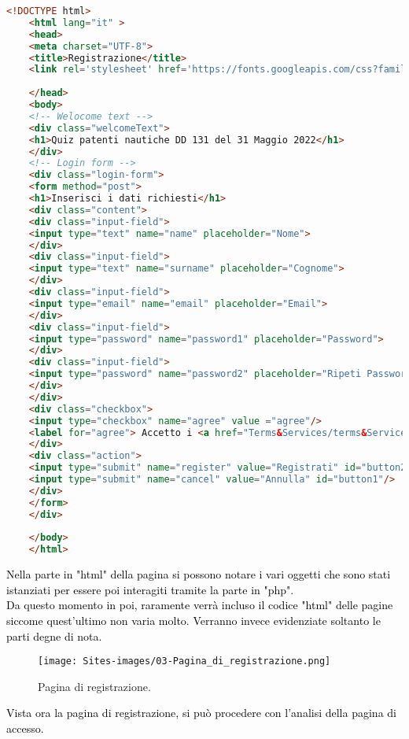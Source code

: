  \begin{lstlisting}[language=html]
 	<!DOCTYPE html>
 	<html lang="it" >
 	<head>
 	<meta charset="UTF-8">
 	<title>Registrazione</title>
 	<link rel='stylesheet' href='https://fonts.googleapis.com/css?family=Rubik:400,700'><link rel="stylesheet" href="style.css">
 	
 	</head>
 	<body>
 	<!-- Welocome text -->
 	<div class="welcomeText">
 	<h1>Quiz patenti nautiche DD 131 del 31 Maggio 2022</h1>
 	</div>
 	<!-- Login form -->
 	<div class="login-form">
 	<form method="post">
 	<h1>Inserisci i dati richiesti</h1>
 	<div class="content">
 	<div class="input-field">
 	<input type="text" name="name" placeholder="Nome">
 	</div>
 	<div class="input-field">
 	<input type="text" name="surname" placeholder="Cognome">
 	</div>
 	<div class="input-field">
 	<input type="email" name="email" placeholder="Email">
 	</div>
 	<div class="input-field">
 	<input type="password" name="password1" placeholder="Password">
 	</div>
 	<div class="input-field">
 	<input type="password" name="password2" placeholder="Ripeti Password">
 	</div>
 	</div>
 	<div class="checkbox">
 	<input type="checkbox" name="agree" value ="agree"/>
 	<label for="agree"> Accetto i <a href="Terms&Services/terms&Services.html">Termini</a> di utilizzo</label>
 	</div>
 	<div class="action">
 	<input type="submit" name="register" value="Registrati" id="button2"/>
 	<input type="submit" name="cancel" value="Annulla" id="button1"/>
 	</div>
 	</form>
 	</div>
 	
 	</body>
 	</html>
  \end{lstlisting}
  
  \textcolor{black}{Nella parte in "html" della pagina si possono notare i vari oggetti che sono stati istanziati per essere poi interagiti tramite la parte in "php".\\
  	 Da questo momento in poi, raramente verrà incluso il codice "html" delle pagine siccome quest'ultimo non varia molto. Verranno invece evidenziate soltanto le parti degne di nota.}\\
  
 \begin{figure}[h]
 	\begin{center}
 		\texttt{[image: Sites-images/03-Pagina\_di\_registrazione.png]}
 		\caption{Pagina di registrazione.}
 	\end{center}
 \end{figure}
  
  \textcolor{black}{Vista ora la pagina di registrazione, si può procedere con l'analisi della pagina di accesso.}\\
  
